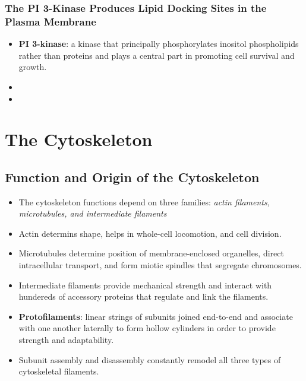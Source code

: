 \documentclass[12pt,a4paper]{article}
\begin{document}
\subsubsection{The PI 3-Kinase Produces Lipid Docking Sites in the Plasma Membrane}
\begin{itemize}
    \item \textbf{PI 3-kinase}: a kinase that principally phosphorylates inositol phospholipids rather than proteins and plays a central part in promoting cell survival and growth.
    \item 
    \item 
\end{itemize}

\clearpage
\section{The Cytoskeleton}
\subsection{Function and Origin of the Cytoskeleton}
\begin{itemize}
    \item The cytoskeleton functions depend on three families: \textit{actin filaments, microtubules, and intermediate filaments}
    \item Actin determins shape, helps in whole-cell locomotion, and cell division.
    \item Microtubules determine position of membrane-enclosed organelles, direct intracellular transport, and form miotic spindles that segregate chromosomes.
    \item Intermediate filaments provide mechanical strength and interact with hundereds of accessory proteins that regulate and link the filaments.
    \item \textbf{Protofilaments}: linear strings of subunits joined end-to-end and associate with one another laterally to form hollow cylinders in order to provide strength and adaptability.
    \item Subunit assembly and disassembly constantly remodel all three types of cytoskeletal filaments.
\end{itemize}
\end{document}
